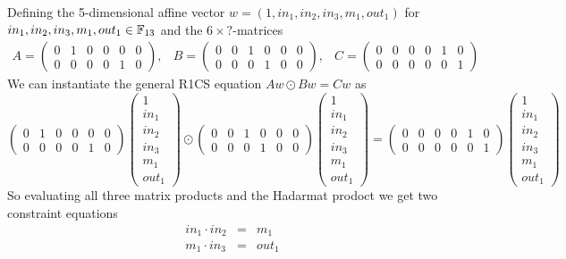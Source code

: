 \begin{example}
\label{main_example_2_4}
Defining the 5-dimensional affine vector $w =(1,in_1,in_2,in_3,m_1,out_1)$ for $in_1,in_2,in_3,m_1,out_1 \in \mathbb{F}_{13}$ and the $6\times ?$-matrices
$$
\begin{array}{lcr}
A = \begin{pmatrix}
0 & 1 & 0 & 0 & 0 & 0 \\ 
0 & 0 & 0 & 0 & 1 & 0
\end{pmatrix}, &
B = \begin{pmatrix}
0 & 0 & 1 & 0 & 0 & 0 \\ 
0 & 0 & 0 & 1 & 0 & 0
\end{pmatrix}, &
C = \begin{pmatrix}
0 & 0 & 0 & 0 & 1 & 0 \\ 
0 & 0 & 0 & 0 & 0 & 1
\end{pmatrix} 
\end{array}
$$
We can instantiate the general R1CS equation $Aw \odot Bw = Cw$ as
$$
\begin{pmatrix}
0 & 1 & 0 & 0 & 0 & 0 \\ 
0 & 0 & 0 & 0 & 1 & 0
\end{pmatrix} 
\begin{pmatrix}
1\\ in_1 \\ in_2 \\ in_3 \\ m_1 \\ out_1 
\end{pmatrix}\odot 
\begin{pmatrix}
0 & 0 & 1 & 0 & 0 & 0 \\ 
0 & 0 & 0 & 1 & 0 & 0
\end{pmatrix} 
\begin{pmatrix}
1\\ in_1 \\ in_2 \\ in_3 \\ m_1 \\ out_1 
\end{pmatrix} =
\begin{pmatrix}
0 & 0 & 0 & 0 & 1 & 0 \\ 
0 & 0 & 0 & 0 & 0 & 1
\end{pmatrix} 
\begin{pmatrix}
1\\ in_1 \\ in_2 \\ in_3 \\ m_1 \\ out_1 
\end{pmatrix}
$$
So evaluating all three matrix products and the Hadarmat prodoct we get two constraint equations
$$
\begin{array}{rcl}
in_1 \cdot in_2  &= & m_1 \\
m_1 \cdot in_3  &= & out_1 \\
\end{array}
$$
\end{example}

